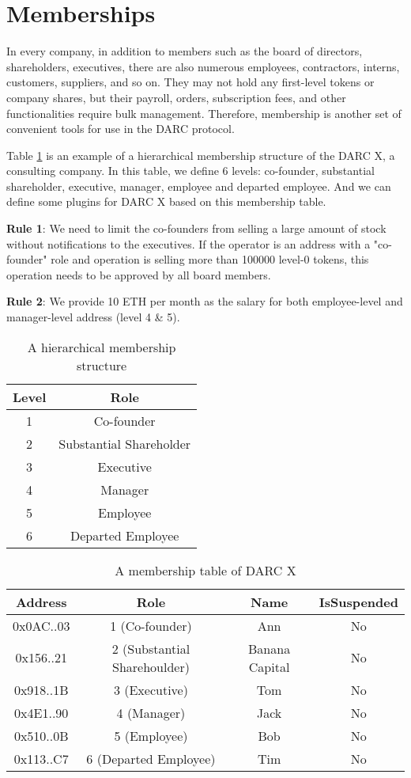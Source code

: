 \documentclass[main.tex]{subfiles}
\begin{document}
\section{Memberships}

In every company, in addition to members such as the board of directors, shareholders, executives, there are also numerous employees, contractors, interns, customers, suppliers, and so on. They may not hold any first-level tokens or company shares, but their payroll, orders, subscription fees, and other functionalities require bulk management. Therefore, membership is another set of convenient tools for use in the DARC protocol.



Table \ref{table:1} is an example of a hierarchical membership structure of the DARC X, a consulting company. In this table, we define 6 levels: co-founder, substantial shareholder, executive, manager, employee and departed employee. And we can define some plugins for DARC X based on this membership table.

\textbf{Rule 1}: We need to limit the co-founders from selling a large amount of stock without notifications to the executives. If the operator is an address with a "co-founder" role and operation is selling more than 100000 level-0 tokens, this operation needs to be approved by all board members.

\textbf{Rule 2}: We provide 10 ETH per month as the salary for both employee-level and manager-level address (level 4 \& 5).

\begin{table}[h!]
\centering
\begin{tabular}{||c c||} 
 \hline
 Level & Role \\ [0.5ex] 
 \hline\hline
 1 & Co-founder \\ 
 2 & Substantial Shareholder \\
 3 & Executive \\
 4 & Manager \\
 5 & Employee \\
 6 & Departed Employee \\ [1ex] 
 \hline
\end{tabular}
\caption{A hierarchical membership structure}
\label{table:1}
\end{table}

\begin{table}[h!]
\centering
\begin{tabular}{||c c c c||} 
 \hline
 Address & Role & Name & IsSuspended \\ [0.5ex] 
 \hline\hline
 0x0AC..03 & 1 (Co-founder) & Ann & No \\
 0x156..21 & 2 (Substantial Sharehoulder) & Banana Capital & No \\
 0x918..1B & 3 (Executive) & Tom & No \\
 0x4E1..90 & 4 (Manager) & Jack & No \\
 0x510..0B & 5 (Employee) & Bob & No \\
 0x113..C7 & 6 (Departed Employee) & Tim & No \\ [1ex] 
 \hline
\end{tabular}
\caption{A membership table of DARC X}
\label{table:2}
\end{table}
\end{document}
